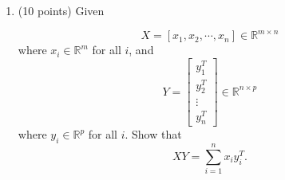 \documentclass[11pt]{article}
\begin{document}
\begin{enumerate}
\begin{enumerate}
Explain why the decision boundary of logistic regression is still
linear.

{\color{red}


\[
\theta(w^T x)=0.5
\]

using the sigmoid function
\[
\frac{1}{1+e^{-w^T x}}=0.5
\]

take the reciprocal of both sides and simplify
\[
1+e^{-w^T x}=2
\]
\[
e^{-w^T x}=1
\]
\[
-w^T x=\ln(1)
\]
\[
-w^T x=0 \implies w^T x=0
\]

Since $w^T x$ is a linear function of $x$, the decision boundary is linear.
}

\item (5 points) Is the decision boundary still linear if the prediction rule
is changed to threshold $0.9$?

{\color{red}
Yes. The boundary is defined by
\[
\theta(w^T x)=0.9
\]

\[
\frac{1}{1+e^{-w^T x}}=0.9
\]

Solving:
\[
1=0.9(1+e^{-w^T x})
\]
\[
0.1=0.9e^{-w^T x}
\]
\[
e^{-w^T x}=\frac{1}{9}
\]

natural log:
\[
-w^T x=\ln(1/9)
\]
\[
w^T x=\ln(9)
\]

this is still a linear equation of the form $w^T x = c$, it's just shifted. 
}

\item (5 points) What is the essential property that results in the
linear decision boundary?

{\color{red}
The essential property is that the input to the sigmoid function is a linear combination of the features ($w^T x$). Because the sigmoid function is monotonic, applying a threshold to the output probability is the same as applying a threshold directly to the linear input. }

\end{enumerate}

\item (10 points) Given

$$X=[x_1,x_2,\cdots,x_n]\in\mathbb{R}^{m\times n}$$
where
$x_i\in\mathbb{R}^m$ for all $i$, and
$$Y=\begin{bmatrix}
    y_1^T       \\
    y_2^T       \\
    \vdots\\
    y_n^T
\end{bmatrix}\in\mathbb{R}^{n\times p}$$
where $y_i\in\mathbb{R}^p$ for all $i$. Show that $$XY=\sum_{i=1}^n
x_i y_i^T.$$

{\color{red}

}
\end{enumerate}
\end{document}
